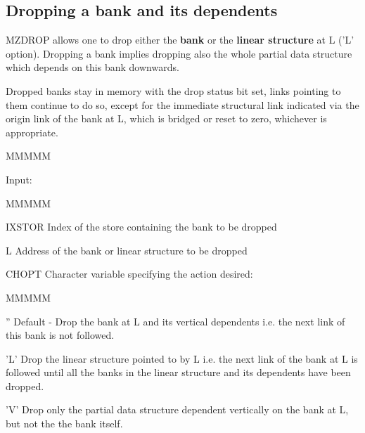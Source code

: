 \subsection{Dropping a bank and its dependents}
\par MZDROP allows one to drop either the {\bf bank}
or the {\bf linear structure} at L ('L' option).
Dropping a bank implies dropping also the whole partial
data structure which depends on this bank downwards.
\par Dropped banks stay in memory with the drop status bit set,
links pointing to them continue to do so,
except for the immediate structural link indicated via the
origin link of the bank at L, which is bridged or reset to zero,
whichever is appropriate.
\begin{DL}{MMMMM}
\item[Input:
]
\begin{DL}{MMMMM}
\item[IXSTOR
]Index of the store containing the bank to be dropped
\item[L
]Address of the bank or linear structure to be dropped
\item[CHOPT
]Character variable specifying the action desired:
\begin{DL}{MMMMM}
\item[''
]Default - Drop the bank at L and its vertical dependents
\newline i.e. the next link of this bank is not followed.
\item['L'
]Drop the linear structure pointed to by L
\newline i.e. the next link of the bank at L is followed until
all the banks in the linear structure and its dependents have been
dropped.
\item['V'
]Drop only the partial data structure
dependent vertically on the bank at L, but not the the bank itself.
\end{DL}
\end{DL}
\end{DL}
